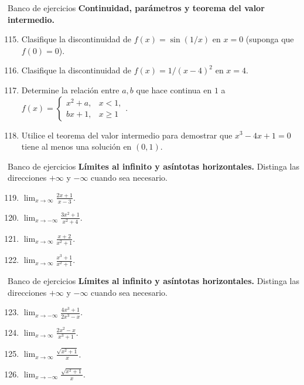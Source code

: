 \documentclass[12pt,aspectratio=169]{beamer}
\begin{document}
\begin{frame}[t,allowframebreaks]{Banco de ejercicios}
\small
\noindent \textbf{Continuidad, parámetros y teorema del valor intermedio.}\par\smallskip
\begin{enumerate}\setcounter{enumi}{114}
\item Clasifique la discontinuidad de $f(x)=\sin(1/x)$ en $x=0$ (suponga que $f(0)=0$).
\item Clasifique la discontinuidad de $f(x)=1/(x-4)^2$ en $x=4$.
\item Determine la relación entre $a,b$ que hace continua en $1$ a $f(x)=\begin{cases}x^2+a,&x<1,\\bx+1,&x\ge1\end{cases}$.
\item Utilice el teorema del valor intermedio para demostrar que $x^3-4x+1=0$ tiene al menos una solución en $(0,1)$.
\end{enumerate}
\end{frame}


\begin{frame}[t,allowframebreaks]{Banco de ejercicios}
\small
\noindent \textbf{Límites al infinito y asíntotas horizontales.} Distinga las direcciones $+\infty$ y $-\infty$ cuando sea necesario.\par\smallskip
\begin{enumerate}\setcounter{enumi}{118}
\item $\displaystyle\lim_{x\to\infty}\frac{2x+1}{x-3}$.
\item $\displaystyle\lim_{x\to-\infty}\frac{3x^2+1}{x^2+4}$.
\item $\displaystyle\lim_{x\to\infty}\frac{x+2}{x^2+1}$.
\item $\displaystyle\lim_{x\to\infty}\frac{x^3+1}{x^2+1}$.
\end{enumerate}
\end{frame}


\begin{frame}[t,allowframebreaks]{Banco de ejercicios}
\small
\noindent \textbf{Límites al infinito y asíntotas horizontales.} Distinga las direcciones $+\infty$ y $-\infty$ cuando sea necesario.\par\smallskip
\begin{enumerate}\setcounter{enumi}{122}
\item $\displaystyle\lim_{x\to-\infty}\frac{4x^3+1}{2x^3-x}$.
\item $\displaystyle\lim_{x\to\infty}\frac{2x^2-x}{x^3+1}$.
\item $\displaystyle\lim_{x\to\infty}\frac{\sqrt{x^2+1}}{x}$.
\item $\displaystyle\lim_{x\to-\infty}\frac{\sqrt{x^2+1}}{x}$.
\end{enumerate}
\end{frame}
\end{document}
